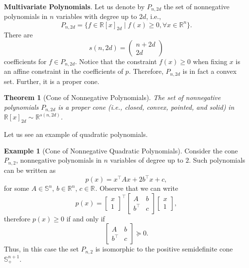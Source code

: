 \documentclass[
]{book}
\newtheorem{theorem}{Theorem}[chapter]
\theoremstyle{definition}
\theoremstyle{definition}
\newtheorem{example}{Example}[chapter]
\theoremstyle{definition}
\theoremstyle{definition}
\theoremstyle{remark}
\begin{document}
\textbf{Multivariate Polynomials}. Let us denote by \(P_{n,2d}\) the set of nonnegative polynomials in \(n\) variables with degree up to \(2d\), i.e.,
\[
P_{n,2d} = \{ f \in \mathbb{R}[x]_{2d} \mid f(x) \geq 0, \forall x \in \mathbb{R}^{n} \}.
\]
There are
\[
s(n,2d) = \begin{pmatrix} n + 2d \\ 2d \end{pmatrix}
\]
coefficients for \(f \in P_{n,2d}\). Notice that the constraint \(f(x) \geq 0\) when fixing \(x\) is an affine constraint in the coefficients of \(p\). Therefore, \(P_{n,2d}\) is in fact a convex set. Further, it is a proper cone.

\begin{theorem}[Cone of Nonnegative Polynomials]
\protect\hypertarget{thm:ConeNonnegative}{}\label{thm:ConeNonnegative}The set of nonnegative polynomials \(P_{n,2d}\) is a proper cone (i.e., closed, convex, pointed, and solid) in \(\mathbb{R}[x]_{2d} \sim \mathbb{R}^{s(n,2d)}\).
\end{theorem}

Let us see an example of quadratic polynomials.

\begin{example}[Cone of Nonnegative Quadratic Polynomials]
\protect\hypertarget{exm:ConeNonnegativeQuadratic}{}\label{exm:ConeNonnegativeQuadratic}Consider the cone \(P_{n,2}\), nonnegative polynomials in \(n\) variables of degree up to \(2\). Such polynomials can be written as
\[
p(x) = x^\top A x + 2 b^\top x + c,
\]
for some \(A \in \mathbb{S}^{n}\), \(b \in \mathbb{R}^{n}\), \(c \in \mathbb{R}^{}\). Observe that we can write
\[
p(x) = \begin{bmatrix} x \\ 1 \end{bmatrix}^\top\begin{bmatrix} A & b \\ b^\top& c \end{bmatrix} \begin{bmatrix} x \\ 1 \end{bmatrix},
\]
therefore \(p(x) \geq 0\) if and only if
\[
\begin{bmatrix} A & b \\ b^\top& c \end{bmatrix} \succeq 0.
\]
Thus, in this case the set \(P_{n,2}\) is isomorphic to the positive semidefinite cone \(\mathbb{S}^{n+1}_{+}\).
\end{example}
\end{document}
